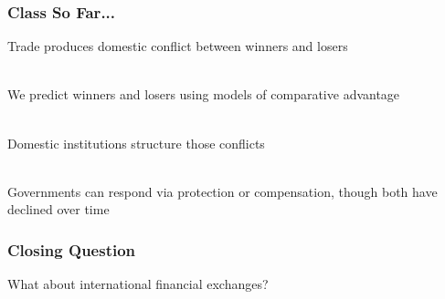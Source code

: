 \documentclass[handout]{beamer}
\begin{document}
\begin{frame} 
	\frametitle{\LARGE{Class So Far...}}
	\begin{itemize}
		\large{
			\item Trade produces domestic conflict between winners and losers \pause 
			\\~\\ 
			\item We predict winners and losers using models of comparative advantage \pause  
			\\~\\
			\item Domestic institutions structure those conflicts \pause 
			\\~\\
			\item Governments can respond via protection or compensation, though both have declined over time 
		}
	\end{itemize}
\end{frame}

\begin{frame} 
	\frametitle{\LARGE{Closing Question}}
	\centering
	\Large{What about international financial exchanges?} 
\end{frame}
\end{document}
